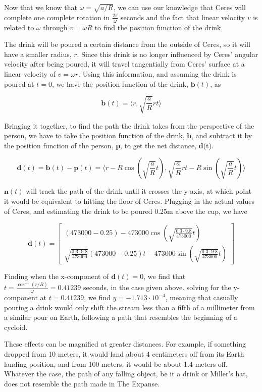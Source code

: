 \documentclass{amsart}
\renewcommand{\vec}{\textbf}
\theoremstyle{definition}
\begin{document}
Now that we know that $\omega = \sqrt{a/R}$, we can use our knowledge
that Ceres will complete one complete rotation in
$\frac{2\pi}{\omega}$ seconds and the fact that linear velocity $v$ is
related to $\omega$ through $v = \omega R$ to find the position
function of the drink.

The drink will be poured a certain distance from the outside of Ceres,
so it will have a smaller radius, \(r\). Since this drink is no longer
influenced by Ceres' angular velocity after being poured, it will
travel tangentially from Ceres' surface at a linear velocity of \(v =
\omega r\). Using this information, and assuming the drink is poured
at $t = 0$, we have the position function of the drink, $\vec{b}(t)$,
as

\[
\vec{b}(t) = \langle r, \sqrt{\frac{a}{R}}rt\rangle
\]

Bringing it together, to find the path the drink takes from the
perspective of the person, we have to take the position function of
the drink, \vec{b}, and subtract it by the position function of the
person, \vec{p}, to get the net distance, \vec{d}(t).

\[
\vec{d}(t) = \vec{b}(t) - \vec{p}(t) = \langle r - R\cos(\sqrt{\frac{a}{R}} t), \sqrt{\frac{a}{R}}rt - R \sin(\sqrt{\frac{a}{R}} t)\rangle
\]

$\vec{n}(t)$ will track the path of the drink until it crosses the
y-axis, at which point it would be equivalent to hitting the floor of
Ceres. Plugging in the actual values of Ceres, and estimating the
drink to be poured $0.25$m above the cup, we have

\[
\vec{d}(t) = 
\begin{bmatrix}
(473000 - 0.25) - 473000\cos(\sqrt{\frac{0.3\cdot9.8}{473000}}t)\\ \sqrt{\frac{0.3\cdot9.8}{473000}}(473000 - 0.25)t - 473000 \sin(\sqrt{\frac{0.3\cdot9.8}{473000}}t)
\end{bmatrix}
\]

Finding when the x-component of $\vec{d}(t) = 0$, we find that $t =
\frac{\cos^{-1}(r/R)}{\omega} = 0.41239$ seconds, in the case given
above. solving for the y-component at $t=0.41239$, we find $y = -1.713
\cdot 10^{-4}$, meaning that casually pouring a drink would only shift
the stream less than a fifth of a millimeter from a similar pour on
Earth, following a path that resembles the beginning of a cycloid.

These effects can be magnified at greater distances. For example, if
something dropped from 10 meters, it would land about 4 centimeters
off from its Earth landing position, and from 100 meters, it would be
about 1.4 meters off. Whatever the case, the path of any falling
object, be it a drink or Miller's hat, does not resemble the path made
in The Expanse.
\end{document}
